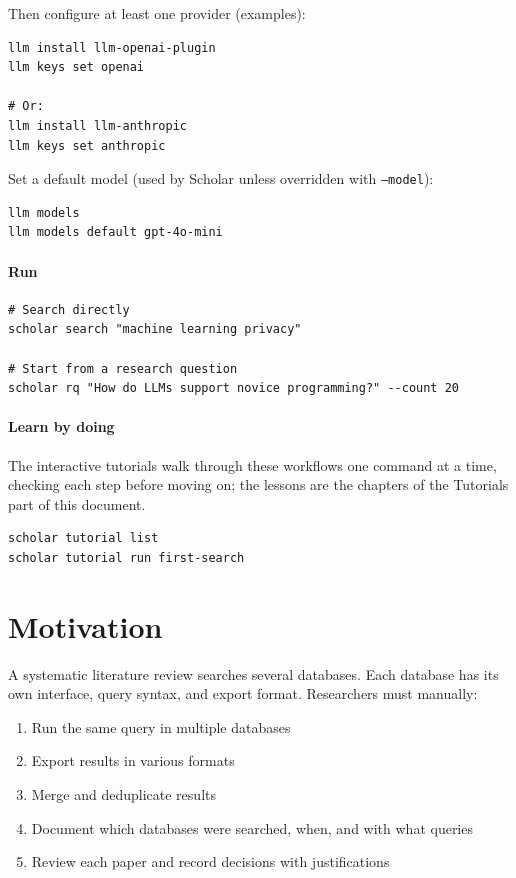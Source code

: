 Then configure at least one provider (examples):
\begin{verbatim}
llm install llm-openai-plugin
llm keys set openai

# Or:
llm install llm-anthropic
llm keys set anthropic
\end{verbatim}

Set a default model (used by Scholar unless overridden with \texttt{--model}):
\begin{verbatim}
llm models
llm models default gpt-4o-mini
\end{verbatim}

\paragraph{Run}
\begin{verbatim}
# Search directly
scholar search "machine learning privacy"

# Start from a research question
scholar rq "How do LLMs support novice programming?" --count 20
\end{verbatim}

\paragraph{Learn by doing}
The interactive tutorials walk through these workflows one command at a
time, checking each step before moving on; the lessons are the chapters of
the Tutorials part of this document.
\begin{verbatim}
scholar tutorial list
scholar tutorial run first-search
\end{verbatim}


\section{Motivation}

A systematic literature review searches several databases.
Each database has its own interface, query syntax, and export format.
Researchers must manually:
\begin{enumerate}
\item Run the same query in multiple databases
\item Export results in various formats
\item Merge and deduplicate results
\item Document which databases were searched, when, and with what queries
\item Review each paper and record decisions with justifications
\end{enumerate}


